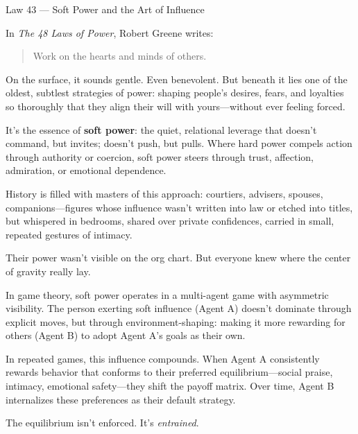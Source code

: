 \begin{PhilosophicalSidebar}{Law 43 --- Soft Power and the Art of Influence}

  In \textit{The 48 Laws of Power}, Robert Greene writes:
  
  \begin{quote}
  Work on the hearts and minds of others.
  \end{quote}
  
  On the surface, it sounds gentle. Even benevolent. But beneath it lies one of the oldest, subtlest strategies of
  power: shaping people’s desires, fears, and loyalties so thoroughly that they align their will with yours—without
  ever feeling forced.
  
  \medskip
  
  It’s the essence of \textbf{soft power}: the quiet, relational leverage that doesn’t command, but invites; doesn’t
  push, but pulls. Where hard power compels action through authority or coercion, soft power steers through trust,
  affection, admiration, or emotional dependence.
  
  \medskip
  
  History is filled with masters of this approach: courtiers, advisers, spouses, companions—figures whose influence
  wasn’t written into law or etched into titles, but whispered in bedrooms, shared over private confidences, carried
  in small, repeated gestures of intimacy.
  
  \medskip
  
  Their power wasn’t visible on the org chart. But everyone knew where the center of gravity really lay.
  
  \medskip
  
  In game theory, soft power operates in a multi-agent game with asymmetric visibility. The person exerting 
  soft influence (Agent A) doesn’t dominate through explicit moves, but through environment-shaping: making it 
  more rewarding for others (Agent B) to adopt Agent A’s goals as their own.
  
  \medskip
  
  In repeated games, this influence compounds. When Agent A consistently rewards behavior that conforms to 
  their preferred equilibrium—social praise, intimacy, emotional safety—they shift the payoff matrix. Over time, 
  Agent B internalizes these preferences as their default strategy.
  
  \medskip
  
  The equilibrium isn’t enforced. It’s \emph{entrained}. 
  

\end{PhilosophicalSidebar}

